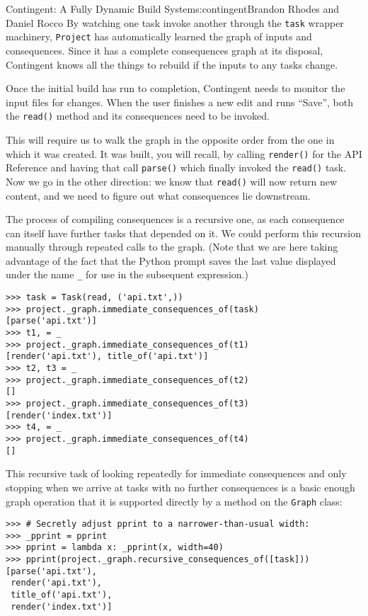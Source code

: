 \begin{aosachapter}{Contingent: A Fully Dynamic Build System}{s:contingent}{Brandon Rhodes and Daniel Rocco}
By watching one task invoke another through the \texttt{task} wrapper
machinery, \texttt{Project} has automatically learned the graph of
inputs and consequences. Since it has a complete consequences graph at
its disposal, Contingent knows all the things to rebuild if the inputs
to any tasks change.

\label{chasing-consequences}

Once the initial build has run to completion, Contingent needs to
monitor the input files for changes. When the user finishes a new edit
and runs ``Save'', both the \texttt{read()} method and its consequences
need to be invoked.

This will require us to walk the graph in the opposite order from the
one in which it was created. It was built, you will recall, by calling
\texttt{render()} for the API Reference and having that call
\texttt{parse()} which finally invoked the \texttt{read()} task. Now we
go in the other direction: we know that \texttt{read()} will now return
new content, and we need to figure out what consequences lie downstream.

The process of compiling consequences is a recursive one, as each
consequence can itself have further tasks that depended on it. We could
perform this recursion manually through repeated calls to the graph.
(Note that we are here taking advantage of the fact that the Python
prompt saves the last value displayed under the name \texttt{\_} for use
in the subsequent expression.)

\begin{verbatim}
>>> task = Task(read, ('api.txt',))
>>> project._graph.immediate_consequences_of(task)
[parse('api.txt')]
>>> t1, = _
>>> project._graph.immediate_consequences_of(t1)
[render('api.txt'), title_of('api.txt')]
>>> t2, t3 = _
>>> project._graph.immediate_consequences_of(t2)
[]
>>> project._graph.immediate_consequences_of(t3)
[render('index.txt')]
>>> t4, = _
>>> project._graph.immediate_consequences_of(t4)
[]
\end{verbatim}

This recursive task of looking repeatedly for immediate consequences and
only stopping when we arrive at tasks with no further consequences is a
basic enough graph operation that it is supported directly by a method
on the \texttt{Graph} class:

\begin{verbatim}
>>> # Secretly adjust pprint to a narrower-than-usual width:
>>> _pprint = pprint
>>> pprint = lambda x: _pprint(x, width=40)
>>> pprint(project._graph.recursive_consequences_of([task]))
[parse('api.txt'),
 render('api.txt'),
 title_of('api.txt'),
 render('index.txt')]
\end{verbatim}


\end{aosachapter}
